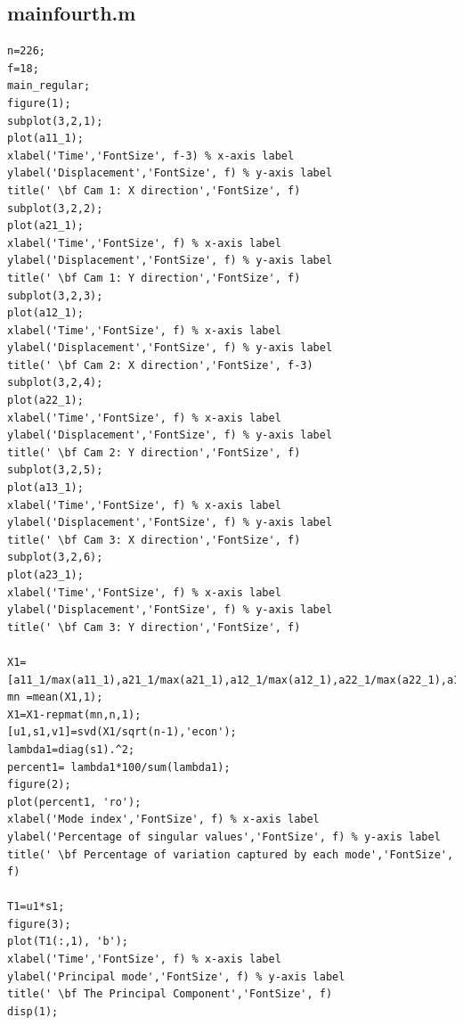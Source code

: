 \documentclass[a4paper]{article}
\begin{document}
\subsection{mainfourth.m}
\begin{lstlisting}[style=myMatlabstyle]
%clc; clear all; close all;
n=226;
f=18;
main_regular;
figure(1);
subplot(3,2,1);
plot(a11_1);
xlabel('Time','FontSize', f-3) % x-axis label
ylabel('Displacement','FontSize', f) % y-axis label
title(' \bf Cam 1: X direction','FontSize', f)
subplot(3,2,2);
plot(a21_1);
xlabel('Time','FontSize', f) % x-axis label
ylabel('Displacement','FontSize', f) % y-axis label
title(' \bf Cam 1: Y direction','FontSize', f)
subplot(3,2,3);
plot(a12_1);
xlabel('Time','FontSize', f) % x-axis label
ylabel('Displacement','FontSize', f) % y-axis label
title(' \bf Cam 2: X direction','FontSize', f-3)
subplot(3,2,4);
plot(a22_1);
xlabel('Time','FontSize', f) % x-axis label
ylabel('Displacement','FontSize', f) % y-axis label
title(' \bf Cam 2: Y direction','FontSize', f)
subplot(3,2,5);
plot(a13_1);
xlabel('Time','FontSize', f) % x-axis label
ylabel('Displacement','FontSize', f) % y-axis label
title(' \bf Cam 3: X direction','FontSize', f)
subplot(3,2,6);
plot(a23_1);
xlabel('Time','FontSize', f) % x-axis label
ylabel('Displacement','FontSize', f) % y-axis label
title(' \bf Cam 3: Y direction','FontSize', f)

X1=[a11_1/max(a11_1),a21_1/max(a21_1),a12_1/max(a12_1),a22_1/max(a22_1),a13_1/max(a13_1),a23_1/max(a23_1)];
mn =mean(X1,1);
X1=X1-repmat(mn,n,1);
[u1,s1,v1]=svd(X1/sqrt(n-1),'econ');
lambda1=diag(s1).^2;
percent1= lambda1*100/sum(lambda1);
figure(2);
plot(percent1, 'ro');
xlabel('Mode index','FontSize', f) % x-axis label
ylabel('Percentage of singular values','FontSize', f) % y-axis label
title(' \bf Percentage of variation captured by each mode','FontSize', f)

T1=u1*s1;
figure(3);
plot(T1(:,1), 'b');
xlabel('Time','FontSize', f) % x-axis label
ylabel('Principal mode','FontSize', f) % y-axis label
title(' \bf The Principal Component','FontSize', f)
disp(1);


\end{lstlisting}
\end{document}

